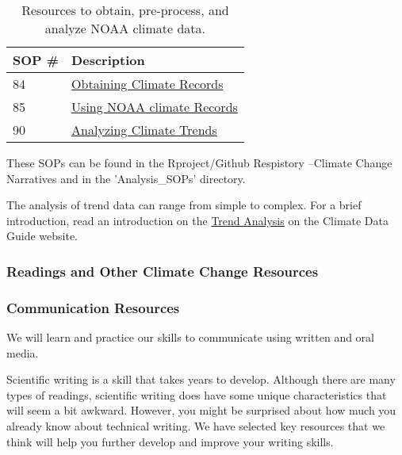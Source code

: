 \documentclass{article}\usepackage[]{graphicx}\usepackage[]{color}
\begin{document}
\begin{table}[h]

\caption{Resources to obtain, pre-process, and analyze NOAA climate data.}\label{tab:tools}
\centering
\begin{tabular}{ll}\hline
SOP \#    & Description                                 \\\hline\hline
84        & \href{https://github.com/marclos/Climate_Change_Narratives/raw/master/Analysis_SOPs/SOP84_Obtaining_Climate_Records.pdf}{Obtaining Climate Records}\\
85        & \href{https://github.com/marclos/Climate_Change_Narratives/raw/master/Analysis_SOPs/SOP85_Using_NOAA_Climate_Records.pdf}{Using NOAA climate Records}\\
90        & \href{https://github.com/marclos/Climate_Change_Narratives/raw/master/Analysis_SOPs/SOP90_Analyzing_Trends.pdf}{Analyzing Climate Trends} \\ \hline
\end{tabular}
\end{table}

These SOPs can be found in the Rproject/Github Respistory --Climate Change Narratives and in the 'Analysis\_SOPs' directory.

The analysis of trend data can range from simple to complex. For a brief introduction, read an introduction on the \href{https://climatedataguide.ucar.edu/climate-data-tools-and-analysis/trend-analysis}{Trend Analysis} on the Climate Data Guide website.

\subsubsection{Readings and Other Climate Change Resources}



\subsubsection{Communication Resources}

We will learn and practice our skills to communicate using written and oral media. 

Scientific writing is a skill that takes years to develop. Although there are many types of readings, scientific writing does have some unique characteristics that will seem a bit awkward. However, you might be surprised about how much you already know about technical writing. We have selected key resources that we think will help you further develop and improve your writing skills.
\end{document}
